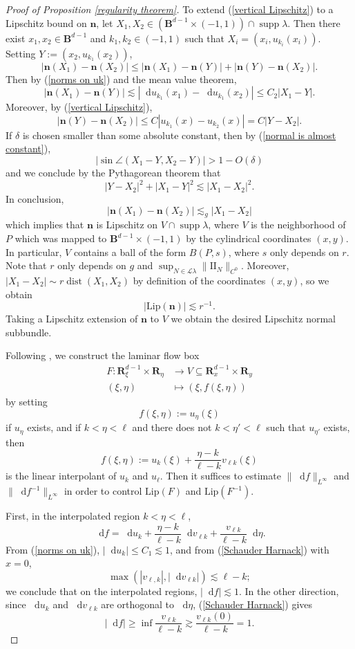 \documentclass[reqno,11pt]{amsart}
\newcommand{\RR}{\mathbf{R}}
\newcommand{\Ball}{\mathbf{B}}
\newcommand*\dif{\mathop{}\!\mathrm{d}}
\DeclareMathOperator{\dist}{dist}
\DeclareMathOperator{\supp}{supp}
\newcommand{\Leaves}{\mathscr L}
\newcommand{\Two}{\mathrm{I\!I}}
\newcommand{\normal}{\mathbf n}
\newcommand{\Lip}{\mathrm{Lip}}
\theoremstyle{definition}
\numberwithin{equation}{section}
\begin{document}
\begin{proof}[Proof of Proposition \ref{regularity theorem}]
To extend (\ref{vertical Lipschitz}) to a Lipschitz bound on $\normal$, let $X_1, X_2 \in (\Ball^{d - 1} \times (-1, 1)) \cap \supp \lambda$.
Then there exist $x_1, x_2 \in \Ball^{d - 1}$ and $k_1, k_2 \in (-1, 1)$ such that $X_i = (x_i, u_{k_i}(x_i))$.
Setting $Y := (x_2, u_{k_1}(x_2))$,
$$|\normal(X_1) - \normal(X_2)| \leq |\normal(X_1) - \normal(Y)| + |\normal(Y) - \normal(X_2)|.$$
Then by (\ref{norms on uk}) and the mean value theorem,
$$|\normal(X_1) - \normal(Y)| \lesssim |\dif u_{k_1}(x_1) - \dif u_{k_1}(x_2)| \leq C_2 |X_1 - Y|.$$
Moreover, by (\ref{vertical Lipschitz}),
$$|\normal(Y) - \normal(X_2)| \leq C|u_{k_1}(x) - u_{k_2}(x)| = C|Y - X_2|.$$
If $\delta$ is chosen smaller than some absolute constant, then by (\ref{normal is almost constant}),
$$|\sin \angle(X_1 - Y, X_2 - Y)| > 1 - O(\delta)$$
and we conclude by the Pythagorean theorem that
$$|Y - X_2|^2 + |X_1 - Y|^2 \lesssim |X_1 - X_2|^2.$$
In conclusion,
$$|\normal(X_1) - \normal(X_2)| \lesssim_g |X_1 - X_2|$$
which implies that $\normal$ is Lipschitz on $V \cap \supp \lambda$, where $V$ is the neighborhood of $P$ which was mapped to $\Ball^{d - 1} \times (-1, 1)$ by the cylindrical coordinates $(x, y)$.
In particular, $V$ contains a ball of the form $B(P, s)$, where $s$ only depends on $r$.
Note that $r$ only depends on $g$ and $\sup_{N \in \Leaves \lambda} \|\Two_N\|_{C^0}$.
Moreover, $|X_1 - X_2| \sim r \dist(X_1, X_2)$ by definition of the coordinates $(x, y)$, so we obtain
\begin{equation}\label{lipschitz normal}
	|\Lip(\normal)| \lesssim r^{-1}.
\end{equation}
Taking a Lipschitz extension of $\normal$ to $V$ we obtain the desired Lipschitz normal subbundle.

Following \cite[Appendix B]{ColdingMinicozziIV}, we construct the laminar flow box
\begin{align*}
	F: \RR^{d - 1}_\xi \times \RR_\eta &\to V \subseteq \RR^{d - 1}_x \times \RR_y \\
	(\xi, \eta) &\mapsto (\xi, f(\xi, \eta))
\end{align*}
by setting
$$f(\xi, \eta) := u_\eta(\xi)$$
if $u_\eta$ exists, and if $k < \eta < \ell$ and there does not $k < \eta' < \ell$ such that $u_{\eta'}$ exists, then
$$f(\xi, \eta) := u_k(\xi) + \frac{\eta - k}{\ell - k} v_{\ell k}(\xi)$$
is the linear interpolant of $u_k$ and $u_\ell$.
Then it suffices to estimate $\|\dif f\|_{L^\infty}$ and $\|\dif f^{-1}\|_{L^\infty}$ in order to control $\Lip(F)$ and $\Lip(F^{-1})$.

First, in the interpolated region $k < \eta < \ell$,
$$\dif f = \dif u_k + \frac{\eta - k}{\ell - k} \dif v_{\ell k} + \frac{v_{\ell k}}{\ell - k} \dif \eta.$$
From (\ref{norms on uk}), $|\dif u_k| \leq C_1 \lesssim 1$, and from (\ref{Schauder Harnack}) with $x = 0$,
$$\max(|v_{\ell, k}|, |\dif v_{\ell k}|) \lesssim \ell - k;$$
we conclude that on the interpolated regions, $|\dif f| \lesssim 1$.
In the other direction, since $\dif u_k$ and $\dif v_{\ell k}$ are orthogonal to $\dif \eta$, (\ref{Schauder Harnack}) gives
$$|\dif f| \geq \inf \frac{v_{\ell k}}{\ell - k} \gtrsim \frac{v_{\ell k}(0)}{\ell - k} = 1.$$


\end{proof}
\end{document}
